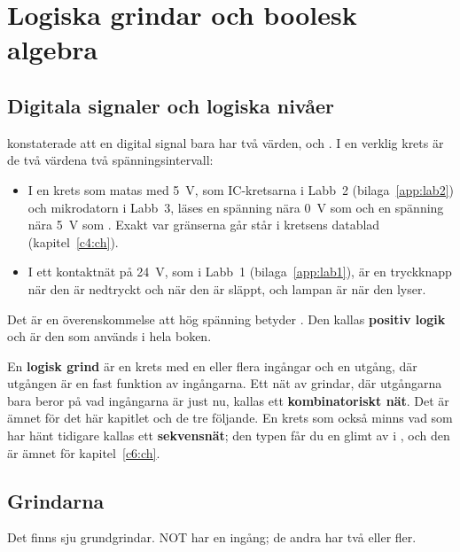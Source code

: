 %

\section{Logiska grindar och boolesk algebra}
\label{c2:app:a}

\subsection{Digitala signaler och logiska nivåer}
\label{c2:a1}
 konstaterade att en digital signal bara har två värden,  och . I en
verklig krets är de två värdena två spänningsintervall:
\begin{itemize}
  \item I en krets som matas med 5~V, som IC-kretsarna i Labb~2 (bilaga~\ref{app:lab2}) och
    mikrodatorn i Labb~3, läses en spänning nära 0~V som  och en spänning nära 5~V som
    . Exakt var gränserna går står i kretsens datablad (kapitel~\ref{c4:ch}).
  \item I ett kontaktnät på 24~V, som i Labb~1 (bilaga~\ref{app:lab1}), är en tryckknapp 
    när den är nedtryckt och  när den är släppt, och lampan är  när den lyser.
\end{itemize}

Det är en överenskommelse att hög spänning betyder . Den kallas \textbf{positiv logik} och
är den som används i hela boken.

En \textbf{logisk grind} är en krets med en eller flera ingångar och en utgång, där utgången är en
fast funktion av ingångarna. Ett nät av grindar, där utgångarna bara beror på vad ingångarna är
just nu, kallas ett \textbf{kombinatoriskt nät}. Det är ämnet för det här kapitlet och de tre
följande. En krets som också minns vad som har hänt tidigare kallas ett \textbf{sekvensnät}; den
typen får du en glimt av i , och den är ämnet för kapitel~\ref{c6:ch}.

\subsection{Grindarna}
\label{c2:a2}
Det finns sju grundgrindar. NOT har en ingång; de andra har två eller fler.

